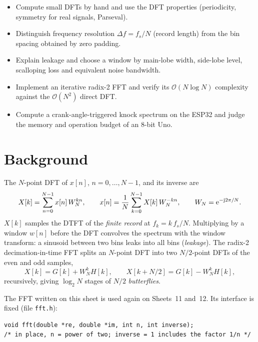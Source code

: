 
\begin{goals}
\begin{itemize}
  \item Compute small DFTs by hand and use the DFT properties (periodicity,
    symmetry for real signals, Parseval).
  \item Distinguish frequency resolution $\Delta f=f_s/N$ (record length) from
    the bin spacing obtained by zero padding.
  \item Explain leakage and choose a window by main-lobe width, side-lobe
    level, scalloping loss and equivalent noise bandwidth.
  \item Implement an iterative radix-2 FFT and verify its $\mathcal O(N\log N)$
    complexity against the $\mathcal O(N^2)$ direct DFT.
  \item Compute a crank-angle-triggered knock spectrum on the ESP32 and judge
    the memory and operation budget of an 8-bit Uno.
\end{itemize}
\end{goals}

\section*{Background}

The $N$-point DFT of $x[n]$, $n=0,\dots,N-1$, and its inverse are
\[
  X[k]=\sum_{n=0}^{N-1}x[n]\,W_N^{kn},\qquad
  x[n]=\frac1N\sum_{k=0}^{N-1}X[k]\,W_N^{-kn},\qquad
  W_N=\mathrm{e}^{-\mathrm{j}2\pi/N}.
\]
$X[k]$ samples the DTFT of the \emph{finite record} at
$f_k=k\,f_s/N$. Multiplying by a window $w[n]$ before the DFT convolves the
spectrum with the window transform: a sinusoid between two bins leaks into all
bins (\emph{leakage}). The radix-2 decimation-in-time FFT splits an $N$-point
DFT into two $N/2$-point DFTs of the even and odd samples,
\[
  X[k]=G[k]+W_N^kH[k],\qquad X[k+N/2]=G[k]-W_N^kH[k],
\]
recursively, giving $\log_2N$ stages of $N/2$ \emph{butterflies}.

The FFT written on this sheet is used again on Sheets~11 and~12. Its interface
is fixed (file \texttt{fft.h}):
\begin{lstlisting}
void fft(double *re, double *im, int n, int inverse);
/* in place, n = power of two; inverse = 1 includes the factor 1/n */
\end{lstlisting}

